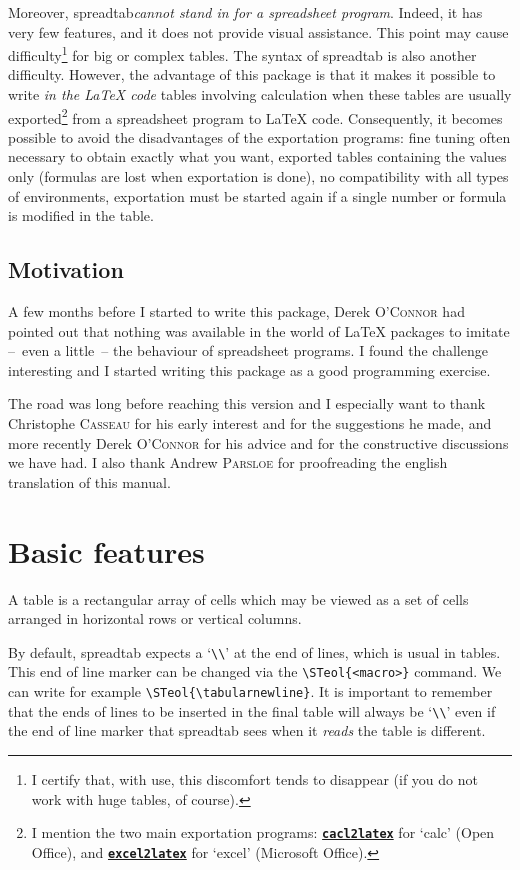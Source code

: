\documentclass[a4paper,10pt]{article}
\newcommand\verbinline[1][]{\lstinline[breaklines=false,basicstyle=\normalsize\ttfamily,#1]}
\newcommand\ST{\textsf{spreadtab}\xspace}
\begin{document}
\begin{<table environment>}
Moreover, \ST \emph{cannot stand in for a spreadsheet program}. Indeed, it has very few features, and it does not provide visual assistance. This point may cause difficulty\footnote{I certify that, with use, this discomfort tends to disappear (if you do not work with huge tables, of course).} for big or complex tables. The syntax of \ST is also another difficulty. However, the advantage of this package is that it makes it possible to write \emph{in the \LaTeX{} code} tables involving calculation when these tables are usually exported\footnote{I mention the two main exportation programs: \href{http://calc2latex.sourceforge.net/}{\texttt{\textbf{cacl2latex}}} for `calc' (Open Office), and \href{http://www.ctan.org/tex-archive/support/excel2latex/}{\texttt{\textbf{excel2latex}}} for `excel' (Microsoft Office).} from a spreadsheet program to \LaTeX{} code. Consequently, it becomes possible to avoid the disadvantages of the exportation programs: fine tuning often necessary to obtain exactly what you want, exported tables containing the values only (formulas are lost when exportation is done), no compatibility with all types of environments, exportation must be started again if a single number or formula is modified in the table.

\subsection{Motivation}
A few months before I started to write this package, Derek \textsc{O'Connor} had pointed out that nothing was available in the world of \LaTeX{} packages to imitate --~even a little~-- the behaviour of spreadsheet programs. I found the challenge interesting and I started writing this package as a good programming exercise.

The road was long before reaching this version and I especially want to thank Christophe \textsc{Casseau} for his early interest and for the suggestions he made, and more recently Derek \textsc{O'Connor} for his advice and for the constructive discussions we have had. I also thank Andrew \textsc{Parsloe} for proofreading the english translation of this manual.

\section{Basic features}
A table is a rectangular array of cells which may be viewed as a set of cells arranged in horizontal rows or vertical columns.

\label{STeol}By default, \ST expects a `\verb-\\-' at the end of lines, which is usual in tables. This end of line marker can be changed via the \verbinline-\STeol{<macro>}- command. We can write for example \verbinline-\STeol{\tabularnewline}-. It is important to remember that the ends of lines to be inserted in the final table will always be `\verb-\\-' even if the end of line marker that \ST sees when it \emph{reads} the table is different.


\end{<table environment>}
\end{document}
